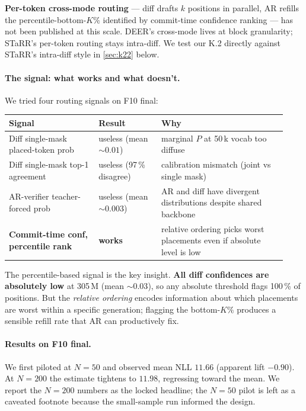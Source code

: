 \textbf{Per-token cross-mode routing} --- diff drafts $k$ positions in
parallel, AR refills the percentile-bottom-$K\%$ identified by
commit-time confidence ranking --- has not been published at this
scale. DEER's cross-mode lives at block granularity; STaRR's per-token
routing stays intra-diff. We test our K.2 directly against STaRR's
intra-diff style in \textsection\ref{sec:k22} below.

\paragraph{The signal: what works and what doesn't.}
We tried four routing signals on F10 final:

\begin{center}
\small
\begin{tabular}{@{}p{0.30\linewidth}p{0.21\linewidth}p{0.42\linewidth}@{}}
\toprule
Signal & Result & Why \\
\midrule
Diff single-mask placed-token prob & useless (mean $\sim 0.01$) & marginal $P$ at 50\,k vocab too diffuse \\
Diff single-mask top-1 agreement & useless (97\,\% disagree) & calibration mismatch (joint vs single mask) \\
AR-verifier teacher-forced prob & useless (mean $\sim 0.003$) & AR and diff have divergent distributions despite shared backbone \\
\textbf{Commit-time conf, percentile rank} & \textbf{works} & relative ordering picks worst placements even if absolute level is low \\
\bottomrule
\end{tabular}
\end{center}

The percentile-based signal is the key insight. \textbf{All diff
confidences are absolutely low} at 305\,M (mean $\sim 0.03$), so any
absolute threshold flags 100\,\% of positions. But the \emph{relative
ordering} encodes information about which placements are worst
within a specific generation; flagging the bottom-$K\%$ produces a
sensible refill rate that AR can productively fix.

\paragraph{Results on F10 final.}
We first piloted at $N=50$ and observed  mean NLL
$11.66$ (apparent lift $-0.90$). At $N=200$ the estimate tightens
to $11.98$, regressing toward the mean. We report the $N=200$
numbers as the locked headline; the $N=50$ pilot is left as a
caveated footnote because the small-sample run informed the design.

